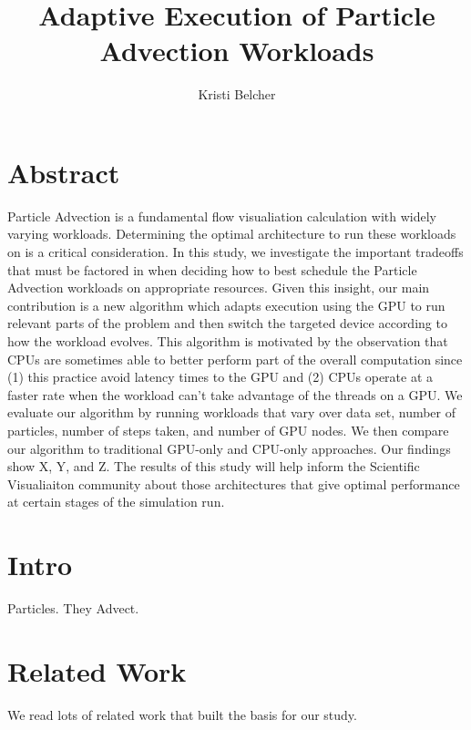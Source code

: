 \documentclass{IEEEtran}
\title{Adaptive Execution of Particle Advection Workloads}
\author{Kristi Belcher}
\begin{document}
\maketitle
\section{Abstract}
Particle Advection is a fundamental flow visualiation calculation with widely varying workloads. 
%
Determining the optimal architecture to run these workloads on is a critical consideration. 
%
In this study, we investigate the important tradeoffs that must be factored in when deciding how to best schedule the Particle Advection workloads on appropriate resources. 
%
Given this insight, our main contribution is a new algorithm which adapts execution using the GPU to run relevant parts of the problem and then switch the targeted device according to how the workload evolves.
%
This algorithm is motivated by the observation that CPUs are sometimes able to better perform part of the overall computation since (1) this practice avoid latency times to the GPU and (2) CPUs operate at a faster rate when the workload can't take advantage of the threads on a GPU.
%
We evaluate our algorithm by running workloads that vary over data set, number of particles, number of steps taken, and number of GPU nodes.
%
We then compare our algorithm to traditional GPU-only and CPU-only approaches.
%
Our findings show X, Y, and Z.
%
The results of this study will help inform the Scientific Visualiaiton community about those architectures that give optimal performance at certain stages of the simulation run.
\section{Intro}
Particles. They Advect.
%
\section{Related Work}
We read lots of related work that built the basis for our study.
%
\end{document}
